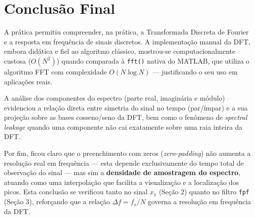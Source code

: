\documentclass[12pt]{article}
\begin{document}
\section{Conclusão Final}

A prática permitiu compreender, na prática, a Transformada Discreta de Fourier e a
resposta em frequência de sinais discretos. A implementação manual da DFT, embora
didática e fiel ao algoritmo clássico, mostrou-se computacionalmente custosa
($O(N^2)$) quando comparada à \texttt{fft()} nativa do MATLAB, que utiliza o algoritmo
FFT com complexidade $O(N\log N)$ — justificando o seu uso em aplicações reais.

A análise dos componentes do espectro (parte real, imaginária e módulo) evidenciou
a relação direta entre simetria do sinal no tempo (par/ímpar) e a sua projeção sobre
as bases cosseno/seno da DFT, bem como o fenômeno de \textit{spectral leakage} quando
uma componente não cai exatamente sobre uma raia inteira da DFT.

Por fim, ficou claro que o preenchimento com zeros (\textit{zero-padding}) não aumenta
a resolução real em frequência — esta depende exclusivamente do tempo total de observação
do sinal — mas sim a \textbf{densidade de amostragem do espectro}, atuando como uma
interpolação que facilita a visualização e a localização dos picos. Esta conclusão se
verificou tanto no sinal $x_1$ (Seção 2) quanto no filtro \texttt{fpf} (Seção 3),
reforçando que a relação $\Delta f = f_s/N$ governa a resolução em frequência da DFT.
\end{document}
